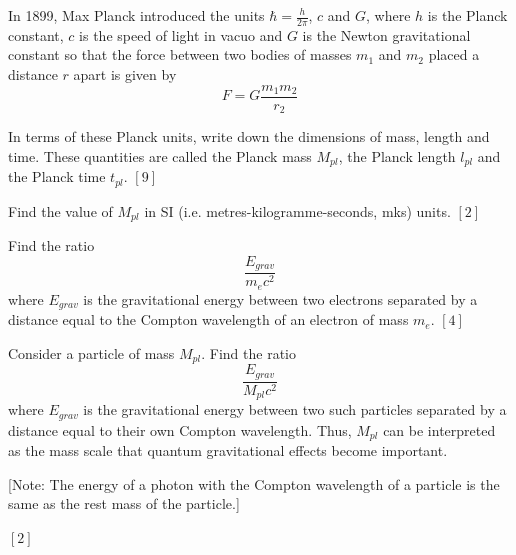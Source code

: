 \begin{problem}
    In 1899, Max Planck introduced the units $\hbar=\frac{h}{2\pi}$, $c$ and $G$, where $h$ is the Planck constant, $c$ is the speed of light in vacuo and $G$ is the Newton gravitational constant so that the force between two bodies of masses $m_1$ and $m_2$ placed a distance $r$ apart is given by \[F=G\frac{m_1 m_2}{r_2}\]

    \begin{subproblem}
        In terms of these Planck units, write down the dimensions of mass, length and time. These quantities are called the Planck mass $M_{pl}$, the Planck length $l_{pl}$ and the Planck time $t_{pl}$. \hfill $[9]$
    \end{subproblem}

    \begin{subproblem}
        Find the value of $M_{pl}$ in SI (i.e. metres-kilogramme-seconds, mks) units.   \hfill $[2]$
    \end{subproblem}

    \begin{subproblem}
        Find the ratio \[\frac{E_{grav}}{m_e c^2}\] where $E_{grav}$ is the gravitational energy between two electrons separated by a distance equal to the Compton wavelength of an electron of mass $m_e$.    \hfill $[4]$
    \end{subproblem}

    \begin{subproblem}
        Consider a particle of mass $M_{pl}$. Find the ratio \[\frac{E_{grav}}{M_{pl} c^2}\] where $E_{grav}$  is the gravitational energy between two such particles separated by a distance equal to their own Compton wavelength. Thus, $M_{pl}$ can be interpreted as the mass scale that quantum gravitational effects become important. 

        
        [Note: The energy of a photon with the Compton wavelength of a particle is the same as the rest mass of the particle.]


    \hfill $[2]$\end{subproblem}
\end{problem}


